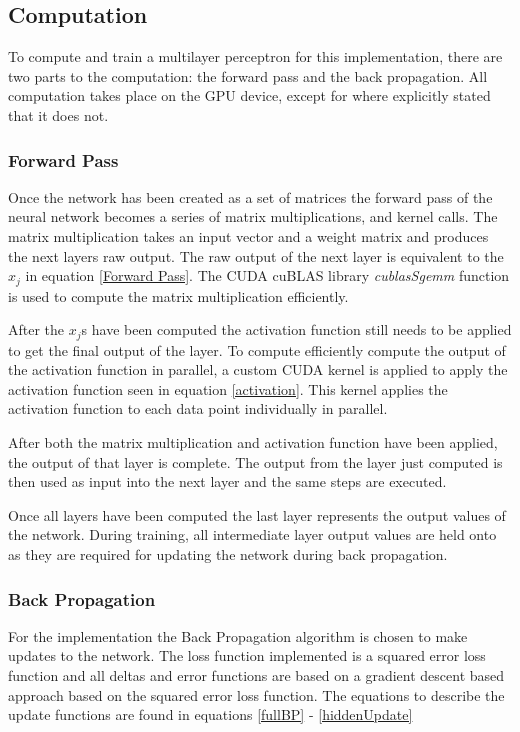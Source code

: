 \documentclass[jair, twoside,11pt,theapa]{article}
\begin{document}
\subsection{Computation}
To compute and train a multilayer perceptron for this implementation, there are two parts to the computation: the forward pass and the back propagation. 
All computation takes place on the GPU device, except for where explicitly stated that it does not. 
\subsubsection{Forward Pass}
Once the network has been created as a set of matrices the forward pass of the neural network becomes a series of matrix multiplications, and kernel calls.
The matrix multiplication takes an input vector and a weight matrix and produces the next layers raw output. 
The raw output of the next layer is equivalent to the $x_j$ in equation \ref{Forward Pass}. 
The CUDA cuBLAS library \textit{cublasSgemm} function is used to compute the matrix multiplication efficiently.

After the $x_j$s have been computed the activation function still needs to be applied to get the final output of the layer. 
To compute efficiently compute the output of the activation function in parallel, a custom CUDA kernel is applied to apply the activation function seen in equation \ref{activation}.
This kernel applies the activation function to each data point individually in parallel. 

After both the matrix multiplication and activation function have been applied, the output of that layer is complete. 
The output from the layer just computed is then used as input into the next layer and the same steps are executed. 

Once all layers have been computed the last layer represents the output values of the network. 
During training, all intermediate layer output values are held onto as they are required for updating the network during back propagation. 

\subsubsection{Back Propagation}
For the implementation the Back Propagation algorithm is chosen to make updates to the network. 
The loss function implemented is a squared error loss function and all deltas and error functions are based on a gradient descent based approach based on the squared error loss function. 
The equations to describe the update functions are found in equations \ref{fullBP} - \ref{hiddenUpdate}
\end{document}
